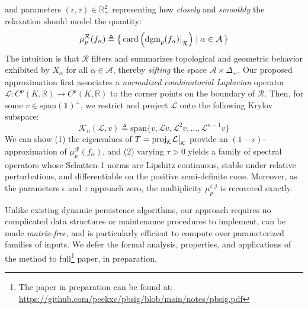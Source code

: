 \documentclass[10pt twocolumn]{article}
\numberwithin{equation}{section}
\newcommand{\+}{%
	\raisebox{0.18ex}{\scaleobj{0.55}{+}}
}
\newcommand\restr[2]{{%
  \left.\kern-\nulldelimiterspace %
  #1 %
  \vphantom{\big|} %
  \right|_{#2} %
  }}
\theoremstyle{definition}
\theoremstyle{definition}
\begin{document}
\begin{multicols}{2}
and parameters $(\epsilon, \tau ) \in \mathbb{R}_+^2$ representing how \emph{closely} and \emph{smoothly} the relaxation should model the quantity: 
	\begin{equation*}\label{eq:mu_alpha}
		\mu_p^{\mathcal{R}}(f_\alpha) \triangleq \big\{ \, 
	\mathrm{card}\left(\restr{\mathrm{dgm}_p(f_\alpha)}{\mathcal{R}} \right) \mid \alpha \in \mathcal{A} \, \big\}
	\end{equation*}
The intuition is that $\mathcal{R}$ filters and summarizes topological and geometric behavior exhibited by $X_\alpha$ for all $\alpha \in \mathcal{A}$, thereby \emph{sifting} the space $\mathcal{A} \times \Delta_+$. 
Our proposed approximation first associates a \emph{normalized combinatorial Laplacian} operator $\mathcal{L} : C^p(K, \mathbb{R}) \to C^p(K, \mathbb{R})$ to the corner points on the boundary of $\mathcal{R}$. Then, for some $v \in \mathrm{span}(\textbf{1})^\perp$, we restrict and project $\mathcal{L}$ onto the following Krylov subspace: 
	\begin{equation*}
	\mathcal{K}_n(\mathcal{L}, v) \triangleq \mathrm{span}\{ v, \mathcal{L}v, \mathcal{L}^2 v, \dots, \mathcal{L}^{n-1}v \}
	\end{equation*}
	We can show (1) the eigenvalues of $T = \mathrm{proj}_{\mathcal{K}} \restr{\mathcal{L}}{\mathcal{K}}$ provide an $(1-\epsilon)$-approximation of $\mu_p^{\mathcal{R}}(f_\alpha)$, 
	and (2) varying $\tau > 0$ yields a family of spectral operators whose Schatten-1 norms are Lipshitz continuous, stable under relative perturbations, and differentiable on the positive semi-definite cone. Moreover, as the parameters $\epsilon$ and $\tau$ approach zero, the multiplicity $\mu_p^{i,j}$ is recovered exactly. 

Unlike existing dynamic persistence algorithms, our approach requires no complicated data structures or maintenance procedures to implement, can be made \emph{matrix-free}, and is particularly efficient to compute over parameterized families of inputs.
We defer the formal analysis, properties, and applications of the method to full\footnote{The paper in preparation can be found at: \url{https://github.com/peekxc/pbsig/blob/main/notes/pbsig.pdf}} paper, in preparation. 


\end{multicols}
\end{document}
